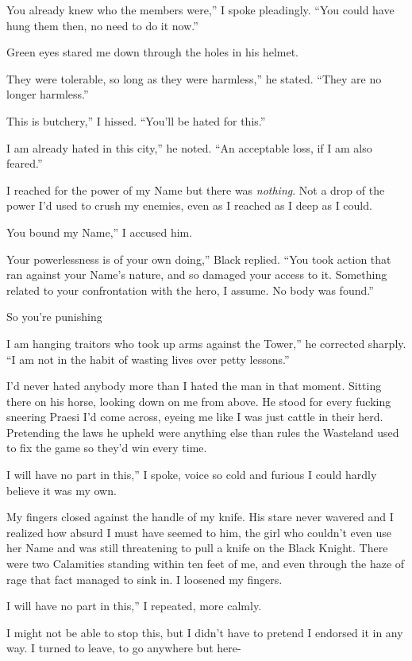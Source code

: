 \documentclass[12pt, openany]{book}
\begin{document}
You already knew who the members were,” I spoke pleadingly. “You could have hung them then, no need to do it now.”

Green eyes stared me down through the holes in his helmet.

They were tolerable, so long as they were harmless,” he stated. “They are no longer harmless.”

This is butchery,” I hissed. “You’ll be hated for this.”

I am already hated in this city,” he noted. “An acceptable loss, if I am also feared.”

I reached for the power of my Name but there was \textit{nothing}. Not a drop of the power I’d used to crush my enemies, even as I reached as I deep as I could.

You bound my Name,” I accused him.

Your powerlessness is of your own doing,” Black replied. “You took action that ran against your Name’s nature, and so damaged your access to it. Something related to your confrontation with the hero, I assume. No body was found.”

So you’re punishing

I am hanging traitors who took up arms against the Tower,” he corrected sharply. “I am not in the habit of wasting lives over petty lessons.”

I’d never hated anybody more than I hated the man in that moment. Sitting there on his horse, looking down on me from above. He stood for every fucking sneering Praesi I’d come across, eyeing me like I was just cattle in their herd. Pretending the laws he upheld were anything else than rules the Wasteland used to fix the game so they’d win every time.

I will have no part in this,” I spoke, voice so cold and furious I could hardly believe it was my own.

My fingers closed against the handle of my knife. His stare never wavered and I realized how absurd I must have seemed to him, the girl who couldn’t even use her Name and was still threatening to pull a knife on the Black Knight. There were two Calamities standing within ten feet of me, and even through the haze of rage that fact managed to sink in. I loosened my fingers. 

I will have no part in this,” I repeated, more calmly.

I might not be able to stop this, but I didn’t have to pretend I endorsed it in any way. I turned to leave, to go anywhere but here-
\end{document}
